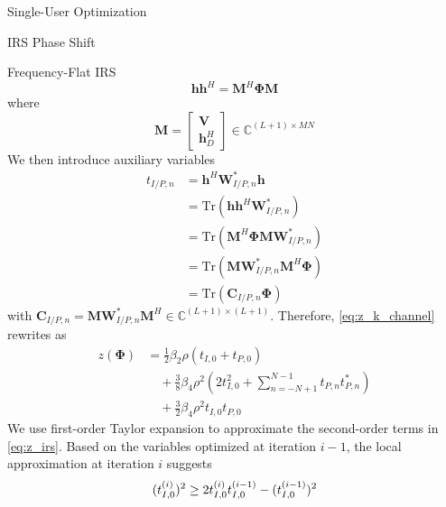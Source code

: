 \documentclass{IEEEtran}
\begin{document}
\begin{section}{Single-User Optimization}
\begin{subsection}{IRS Phase Shift}
\begin{subsubsection}{Frequency-Flat IRS}
			\begin{equation}
				\boldsymbol{h}\boldsymbol{h}^H=\boldsymbol{M}^H\boldsymbol{\Phi}\boldsymbol{M}
			\end{equation}
			where
			\begin{equation}\label{eq:M}
				\boldsymbol{M}=
				\begin{bmatrix}
					\boldsymbol{V} \\
					\boldsymbol{h}_D^H
				\end{bmatrix} \in \mathbb{C}^{(L+1) \times MN}
			\end{equation}
			We then introduce auxiliary variables
			\begin{equation}\label{eq:t}
				\begin{split}
					t_{I/P,n}
					&=\boldsymbol{h}^H\boldsymbol{W}_{I/P,n}^*\boldsymbol{h}\\
					&=\mathrm{Tr}(\boldsymbol{h}\boldsymbol{h}^H\boldsymbol{W}_{I/P,n}^*)\\
					&=\mathrm{Tr}(\boldsymbol{M}^H\boldsymbol{\Phi}\boldsymbol{M}\boldsymbol{W}_{I/P,n}^*)\\
					&=\mathrm{Tr}(\boldsymbol{M}\boldsymbol{W}_{I/P,n}^*\boldsymbol{M}^H\boldsymbol{\Phi})\\
					&=\mathrm{Tr}(\boldsymbol{C}_{I/P,n}\boldsymbol{\Phi})
				\end{split}
			\end{equation}
			with $\boldsymbol{C}_{I/P,n}=\boldsymbol{M}\boldsymbol{W}_{I/P,n}^*\boldsymbol{M}^H \in \mathbb{C}^{(L+1)\times(L+1)}$. Therefore, \ref{eq:z_k_channel} rewrites as
			\begin{equation}\label{eq:z_irs}
				\begin{split}
					z(\boldsymbol{\Phi})
					&=\frac{1}{2}{\beta_2}{\rho}(t_{I,0}+t_{P,0})\\
					&\quad+\frac{3}{8}{\beta_4}{\rho^2} \left(2t_{I,0}^2 + \sum_{n=-N+1}^{N-1}{t_{P,n}t_{P,n}^*}\right)\\
					&\quad+\frac{3}{2}{\beta_4}{\rho^2}t_{I,0}t_{P,0}
				\end{split}
			\end{equation}
			We use first-order Taylor expansion to approximate the second-order terms in \ref{eq:z_irs}. Based on the variables optimized at iteration $i - 1$, the local approximation at iteration $i$ suggests \cite{Adali2010}
			\begin{align}
				(t_{I,0}^{(i)})^2
				& \ge 2 t_{I,0}^{(i)}t_{I,0}^{(i-1)} - (t_{I,0}^{(i-1)})^2\label{eq:t_{I,0}_square}\\

\end{align}
\end{subsubsection}
\end{subsection}
\end{section}
\end{document}
